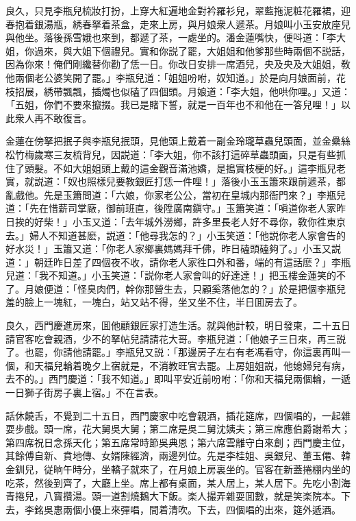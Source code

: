 良久，只見李瓶兒梳妝打扮，上穿大紅遍地金對衿羅衫兒，翠藍拖泥粧花羅裙，迎春抱着銀湯瓶，綉春拏着茶盒，走來上房，與月娘衆人遞茶。月娘叫小玉安放座兒與他坐。落後孫雪娥也來到，都遞了茶，一處坐的。潘金蓮嘴快，便呌道：「李大姐，你過來，與大姐下個禮兒。實和你説了罷，大姐姐和他爹那些時兩個不説話，因為你來！俺們剛纔替你勸了恁一日。你改日安排一席酒兒，央及央及大姐姐，敎他兩個老公婆笑開了罷。」李瓶兒道：「姐姐吩咐，奴知道。」於是向月娘面前，花枝招展，綉帶飄飄，插燭也似磕了四個頭。月娘道：「李大姐，他哄你哩。」又道：「五姐，你們不要來攛掇。我已是賭下誓，就是一百年也不和他在一答兒哩！」以此衆人再不敢復言。

金蓮在傍拏把抿子與李瓶兒抿頭，見他頭上戴着一副金玲瓏草蟲兒頭面，並金纍絲松竹梅歲寒三友梳背兒，因説道：「李大姐，你不該打這碎草蟲頭面，只是有些抓住了頭髮。不如大姐姐頭上戴的這金觀音滿池嬌，是搗實枝梗的好。」這李瓶兒老實，就説道：「奴也照樣兒要教銀匠打恁一件哩！」落後小玉玉簫來跟前遞茶，都亂戲他。先是玉簫問道：「六娘，你家老公公，當初在皇城内那衙門來？」李瓶兒道：「先在惜薪司掌廠，御前班直，後陞廣南鎭守。」玉簫笑道：「嗔道你老人家昨日挨的好柴！」小玉又道：「去年城外澇鄉，許多里長老人好不尋你，敎你徃東京去。」婦人不知道甚麽，説道：「他尋我怎的？」小玉笑道：「他説你老人家會告的好水災！」玉簫又道：「你老人家鄉裏媽媽拜千佛，昨日磕頭磕夠了。」小玉又説道：」朝廷昨日差了四個夜不收，請你老人家徃口外和番，端的有這話麽？」李瓶兒道：「我不知道。」小玉笑道：「説你老人家會叫的好達達！」把玉樓金蓮笑的不了。月娘便道：「怪臭肉們，幹你那營生去，只顧奚落他怎的？」於是把個李瓶兒羞的臉上一塊紅，一塊白，站又站不得，坐又坐不住，半日囬房去了。

良久，西門慶進房來，囬他顧銀匠家打造生活。就與他計較，明日發柬，二十五日請官客吃會親酒，少不的拏帖兒請請花大哥。李瓶兒道：「他娘子三日來，再三説了。也罷，你請他請罷。」李瓶兒又説：「那邊房子左右有老馮看守，你這裏再叫一個，和天福兒輪着晚夕上宿就是，不消教旺官去罷。上房姐姐説，他媳婦兒有病，去不的。」西門慶道：「我不知道。」即叫平安近前吩咐：「你和天福兒兩個輪，一遞一日獅子街房子裏上宿。」不在言表。

話休饒舌，不覺到二十五日，西門慶家中吃會親酒，插花筵席，四個唱的，一起雜耍步戲。頭一席，花大舅吳大舅；第二席是吳二舅沈姨夫；第三席應伯爵謝希大；第四席祝日念孫天化；第五席常時節吳典恩；第六席雲離守白來創；西門慶主位，其餘傅自新、賁地傳、女婿陳經濟，兩邊列位。先是李桂姐、吳銀兒、董玉僊、韓金釧兒，従晌午時分，坐轎子就來了，在月娘上房裏坐的。官客在新蓋捲棚内坐的吃茶，然後到齊了，大廳上坐。席上都有桌面，某人居上，某人居下。先吃小割海青捲兒，八寳攢湯。頭一道割燒鵝大下飯。楽人撮弄雜耍囬數，就是笑楽院本。下去，李銘吳惠兩個小優上來彈唱，間着清吹。下去，四個唱的出來，筵外遞酒。

